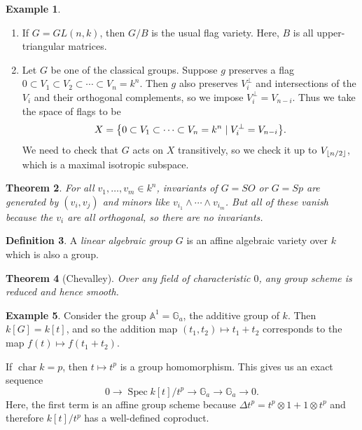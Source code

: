 \documentclass[leqno, openany]{memoir}
\DeclarePairedDelimiter{\floor}{\lfloor}{\rfloor}
\newtheorem{thm}{Theorem}[section]
\theoremstyle{definition}
\newtheorem{defn}[thm]{Definition}
\newtheorem{exm}[thm]{Example}
\theoremstyle{remark}
\theoremstyle{plain}
\theoremstyle{definition}
\theoremstyle{remark}
\newcommand{\A}{\mathbb{A}}
\DeclareMathOperator{\Spec}{Spec}
\begin{document}
\begin{exm}
    \begin{enumerate}
        \item If $G = GL(n, k)$, then $G/B$ is the usual flag variety. Here, $B$ is all upper-triangular matrices.
        \item Let $G$ be one of the classical groups. Suppose $g$ preserves a flag $0 \subset V_1 \subset V_2 \subset \cdots \subset V_n = k^n$. Then $g$ also preserves $V_i^{\perp}$ and intersections of the $V_i$ and their orthogonal complements, so we impose $V_i^{\perp} = V_{n-i}$. Thus we take the space of flags to be
            \[ X = \qty{0 \subset V_1 \subset \cdots \subset V_n = k^n \mid V_i^{\perp} = V_{n-i}}. \]
            We need to check that $G$ acts on $X$ transitively, so we check it up to $V_{\floor{n/2}}$, which is a maximal isotropic subspace.
    \end{enumerate}
\end{exm}

\begin{thm}
    For all $v_1, \ldots, v_m \in k^n$, invariants of $G = SO$ or $G = Sp$ are generated by $(v_i, v_j)$ and minors like $v_{i_1} \wedge \cdots \wedge v_{i_m}$. But all of these vanish because the $v_i$ are all orthogonal, so there are no invariants.
\end{thm}

\begin{defn}
    A \textit{linear algebraic group} $G$ is an affine algebraic variety over $k$ which is also a group. 
\end{defn}

\begin{thm}[Chevalley]
    Over any field of characteristic $0$, any group scheme is reduced and hence smooth.
\end{thm}

\begin{exm}
    Consider the group $\A^1 = \mathbb{G}_a$, the additive group of $k$. Then $k[G] = k[t]$, and so the addition map $(t_1, t_2) \mapsto t_1 + t_2$ corresponds to the map $f(t) \mapsto f(t_1 + t_2)$.

    If $\operatorname{char} k = p$, then $t \mapsto t^p$ is a group homomorphism. This gives us an exact sequence
    \[ 0 \to \Spec k[t]/t^p \to \mathbb{G}_a \to \mathbb{G}_a \to 0. \]
    Here, the first term is an affine group scheme because $\Delta t^p = t^p \otimes 1 + 1 \otimes t^p$ and therefore $k[t] / t^p$ has a well-defined coproduct.
\end{exm}
\end{document}

